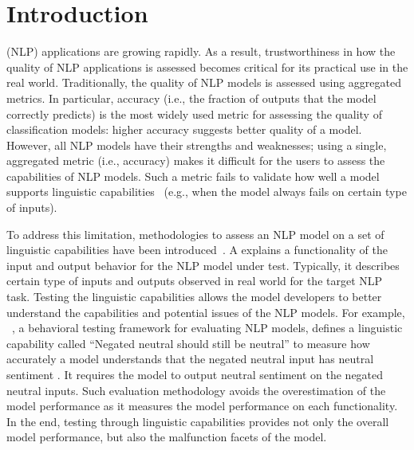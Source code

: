 \section{Introduction}
\label{sec:intro}



\Nlp (NLP) applications are growing rapidly.  As a result,
trustworthiness in how the quality of NLP applications is assessed becomes critical
for its practical use in the real world.  
Traditionally, the quality of NLP models is
assessed using aggregated metrics. In particular, accuracy (i.e., the fraction of outputs that the
model correctly predicts) is the most widely used metric for assessing
the quality of classification models:
higher accuracy suggests better quality of a model.
However, all NLP models have their strengths and weaknesses; 
using a single, aggregated metric (i.e., accuracy) makes it difficult for the users to assess the capabilities of NLP models.
Such a metric fails to validate how well a model supports linguistic capabilities~\cite{geva2019we,gururangan2018annotation} (e.g., when the model always fails on certain type of inputs).

To address this limitation, methodologies to assess an NLP model on a set of
  linguistic capabilities have been introduced~\cite{marcoACL2020checklist,rottger2020hatecheck}. 
A \lc
explains a functionality of the input and output behavior for the
NLP model under test. Typically, it describes certain type of inputs
and outputs observed in real world for the target NLP task.
Testing the linguistic capabilities allows the model developers to better understand the capabilities and potential issues of the NLP
models. 
For example,  \Cklst~\cite{marcoACL2020checklist}, a behavioral testing framework for evaluating NLP models, defines a linguistic capability called ``Negated neutral should still be neutral'' to measure how accurately a \sa model understands that the negated neutral input has neutral sentiment
\cite{marcoACL2020checklist}. 
It requires the \sa model to
output neutral sentiment on the negated neutral inputs. 
Such evaluation methodology avoids the overestimation of the model performance as it measures the model performance on each functionality.
In the end, testing through linguistic capabilities provides not only the overall model performance, but also the malfunction facets of the model.  
  
